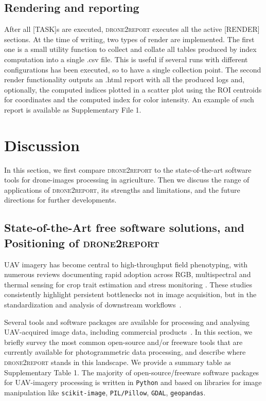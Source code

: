 \documentclass[drones,technicalnote,accept,pdftex,moreauthors]{Definitions/mdpi}
\begin{document}
\subsection{Rendering and reporting}
\label{rendering}

After all [TASK]s are executed, \textsc{drone2report} executes all the active [RENDER] sections. At the time of writing, two types of render are implemented. The first one is a small utility function to collect and collate all tables produced by index computation into a single .csv file. This is useful if several runs with different configurations has been executed, so to have a single collection point. The second render functionality outputs an .html report with all the produced logs and, optionally, the computed indices plotted in a scatter plot using the ROI centroids for coordinates and the computed index for color intensity. An example of such report is available as Supplementary File 1.

\section{Discussion}
\label{discussion}
In this section, we first compare \textsc{drone2report} to the state-of-the-art software tools for drone-images processing in agriculture. Then we discuss the range of applications of \textsc{drone2report}, its strengths and limitations, and the future directions for further developments.

\subsection{State-of-the-Art free software solutions, and Positioning of \textsc{drone2report}}
UAV imagery has become central to high-throughput field phenotyping, with numerous reviews documenting rapid adoption across RGB, multispectral and thermal sensing for crop trait estimation and stress monitoring \cite{tanaka_review_2024, gano2024drone}. 
These studies consistently highlight persistent bottlenecks not in image acquisition, but in the standardization and analysis of downstream workflows~\cite{gano_dronebased_2024}.

Several tools and software packages are available for processing and analysing UAV-acquired image data, including commercial products~\cite{sharma2021development}. 
In this section, we briefly survey the most common open-source and/or freeware tools that are currently available for photogrammetric data processing, and describe where \textsc{drone2report} stands in this landscape. We provide a summary table as Supplementary Table 1.
The majority of open-source/freeware software packages for UAV-imagery processing is written in \texttt{Python} and based on libraries for image manipulation like \texttt{scikit-image}, \texttt{PIL/Pillow}, \texttt{GDAL}, \texttt{geopandas}.
\end{document}
